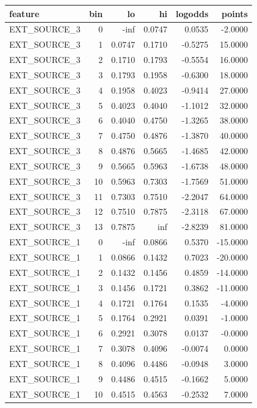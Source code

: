 \begin{tabular}{lrrrrr}
\toprule
feature & bin & lo & hi & logodds & points \\
\midrule
EXT_SOURCE_3 & 0 & -inf & 0.0747 & 0.0535 & -2.0000 \\
EXT_SOURCE_3 & 1 & 0.0747 & 0.1710 & -0.5275 & 15.0000 \\
EXT_SOURCE_3 & 2 & 0.1710 & 0.1793 & -0.5554 & 16.0000 \\
EXT_SOURCE_3 & 3 & 0.1793 & 0.1958 & -0.6300 & 18.0000 \\
EXT_SOURCE_3 & 4 & 0.1958 & 0.4023 & -0.9414 & 27.0000 \\
EXT_SOURCE_3 & 5 & 0.4023 & 0.4040 & -1.1012 & 32.0000 \\
EXT_SOURCE_3 & 6 & 0.4040 & 0.4750 & -1.3265 & 38.0000 \\
EXT_SOURCE_3 & 7 & 0.4750 & 0.4876 & -1.3870 & 40.0000 \\
EXT_SOURCE_3 & 8 & 0.4876 & 0.5665 & -1.4685 & 42.0000 \\
EXT_SOURCE_3 & 9 & 0.5665 & 0.5963 & -1.6738 & 48.0000 \\
EXT_SOURCE_3 & 10 & 0.5963 & 0.7303 & -1.7569 & 51.0000 \\
EXT_SOURCE_3 & 11 & 0.7303 & 0.7510 & -2.2047 & 64.0000 \\
EXT_SOURCE_3 & 12 & 0.7510 & 0.7875 & -2.3118 & 67.0000 \\
EXT_SOURCE_3 & 13 & 0.7875 & inf & -2.8239 & 81.0000 \\
EXT_SOURCE_1 & 0 & -inf & 0.0866 & 0.5370 & -15.0000 \\
EXT_SOURCE_1 & 1 & 0.0866 & 0.1432 & 0.7023 & -20.0000 \\
EXT_SOURCE_1 & 2 & 0.1432 & 0.1456 & 0.4859 & -14.0000 \\
EXT_SOURCE_1 & 3 & 0.1456 & 0.1721 & 0.3862 & -11.0000 \\
EXT_SOURCE_1 & 4 & 0.1721 & 0.1764 & 0.1535 & -4.0000 \\
EXT_SOURCE_1 & 5 & 0.1764 & 0.2921 & 0.0391 & -1.0000 \\
EXT_SOURCE_1 & 6 & 0.2921 & 0.3078 & 0.0137 & -0.0000 \\
EXT_SOURCE_1 & 7 & 0.3078 & 0.4096 & -0.0074 & 0.0000 \\
EXT_SOURCE_1 & 8 & 0.4096 & 0.4486 & -0.0948 & 3.0000 \\
EXT_SOURCE_1 & 9 & 0.4486 & 0.4515 & -0.1662 & 5.0000 \\
EXT_SOURCE_1 & 10 & 0.4515 & 0.4563 & -0.2532 & 7.0000 \\

\end{tabular}
